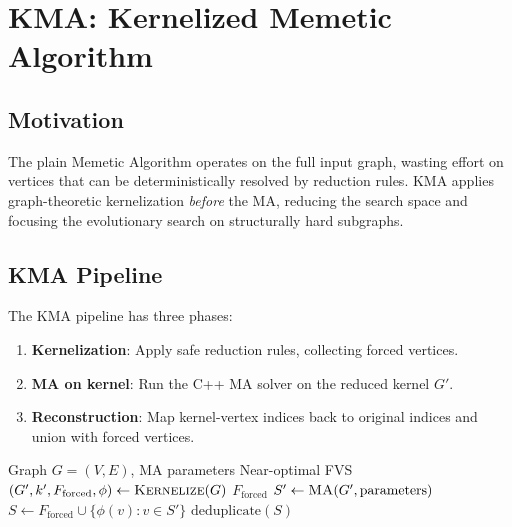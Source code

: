 \documentclass[10pt,a4paper]{report}
\theoremstyle{definition}
\newcommand{\kma}{\textsc{KMA}}
\begin{document}




\chapter{KMA: Kernelized Memetic Algorithm}
\label{ch:kma}

\section{Motivation}

The plain Memetic Algorithm operates on the full input graph, wasting effort on vertices that can be deterministically resolved by reduction rules. \kma{} applies graph-theoretic kernelization \emph{before} the MA, reducing the search space and focusing the evolutionary search on structurally hard subgraphs.

\section{KMA Pipeline}

The KMA pipeline has three phases:

\begin{enumerate}
	\item \textbf{Kernelization}: Apply safe reduction rules, collecting forced vertices.
	\item \textbf{MA on kernel}: Run the C++ MA solver on the reduced kernel $G'$.
	\item \textbf{Reconstruction}: Map kernel-vertex indices back to original indices and union with forced vertices.
\end{enumerate}

\begin{algorithm}[H]
	\caption{KMA: Kernelized Memetic Algorithm}
	\label{alg:kma}
	\begin{algorithmic}[1]
		\Require Graph $G = (V, E)$, MA parameters
		\Ensure Near-optimal FVS
		\State $(G', k', F_{\text{forced}}, \phi) \leftarrow \textsc{Kernelize}(G)$ 
		 \Return $F_{\text{forced}}$ \EndIf
		\State $S' \leftarrow \textsc{MA}(G', \text{parameters})$ 
		\State $S \leftarrow F_{\text{forced}} \cup \{\phi(v) : v \in S'\}$
		\Return $\mathrm{deduplicate}(S)$
	\end{algorithmic}
\end{algorithm}
\end{document}
